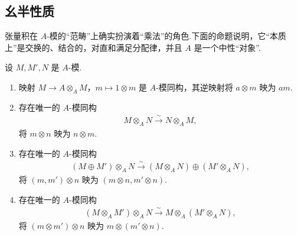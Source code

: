 \subsection{幺半性质}\label{sec:galois-1-8-4}
张量积在 $A$-模的``范畴''上确实扮演着``乘法''的角色.下面的命题说明，它``本质上''是交换的、结合的，对直和满足分配律，并且 $A$ 是一个中性``对象''.
\begin{proposition*}
设 $M,M',N$ 是 $A$-模.
\begin{enumerate}[label=\roman*)]
\item 映射 $M\longrightarrow A\otimes_A M$，$m\mapsto1\otimes m$ 是 $A$-模同构，其逆映射将 $a\otimes m$ 映为 $am$.
\item 存在唯一的 $A$-模同构
\begin{align*}
M\otimes_A N\xrightarrow{\sim}N\otimes_A M,
\end{align*}
将 $m\otimes n$ 映为 $n\otimes m$.
\item 存在唯一的 $A$-模同构
\begin{align*}
(M\oplus M')\otimes_A N\xrightarrow{\sim}(M\otimes_A N)\oplus(M'\otimes_A N),
\end{align*}
将 $(m,m')\otimes n$ 映为 $(m\otimes n,m'\otimes n)$.
\item 存在唯一的 $A$-模同构
\begin{align*}
(M\otimes_A M')\otimes_A N\xrightarrow{\sim}M\otimes_A(M'\otimes_A N),
\end{align*}
将 $(m\otimes m')\otimes n$ 映为 $m\otimes(m'\otimes n)$.
\end{enumerate}
\end{proposition*}
